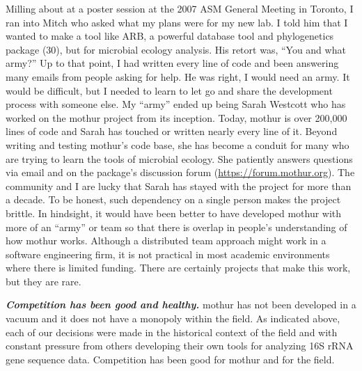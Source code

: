 \documentclass[11pt,]{article}
\begin{document}
Milling about at a poster session at the 2007 ASM General Meeting in
Toronto, I ran into Mitch who asked what my plans were for my new lab. I
told him that I wanted to make a tool like ARB, a powerful database tool
and phylogenetics package (30), but for microbial ecology analysis. His
retort was, ``You and what army?'' Up to that point, I had written every
line of code and been answering many emails from people asking for help.
He was right, I would need an army. It would be difficult, but I needed
to learn to let go and share the development process with someone else.
My ``army'' ended up being Sarah Westcott who has worked on the mothur
project from its inception. Today, mothur is over 200,000 lines of code
and Sarah has touched or written nearly every line of it. Beyond writing
and testing mothur's code base, she has become a conduit for many who
are trying to learn the tools of microbial ecology. She patiently
answers questions via email and on the package's discussion forum
(\url{https://forum.mothur.org}). The community and I are lucky that
Sarah has stayed with the project for more than a decade. To be honest,
such dependency on a single person makes the project brittle. In
hindsight, it would have been better to have developed mothur with more
of an ``army'' or team so that there is overlap in people's
understanding of how mothur works. Although a distributed team approach
might work in a software engineering firm, it is not practical in most
academic environments where there is limited funding. There are
certainly projects that make this work, but they are rare.

\textbf{\emph{Competition has been good and healthy.}} mothur has not
been developed in a vacuum and it does not have a monopoly within the
field. As indicated above, each of our decisions were made in the
historical context of the field and with constant pressure from others
developing their own tools for analyzing 16S rRNA gene sequence data.
Competition has been good for mothur and for the field.
\end{document}
